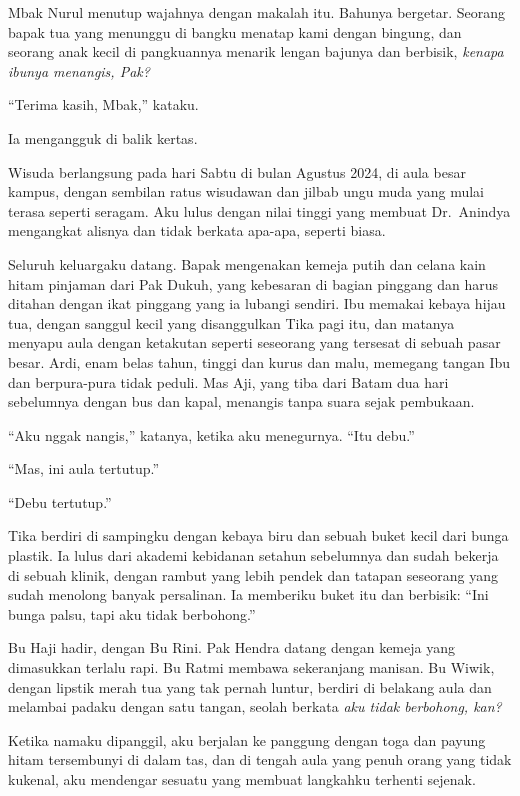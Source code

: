 \documentclass[11pt,twoside,openany]{book}
\makeatletter
\newcommand{\scenebreak}{\par\vspace{0.9em}{\centering\textsc{*\hspace{0.7em}*\hspace{0.7em}*}\par}\vspace{0.9em}\@afterindentfalse\@afterheading}
\makeatother
\begin{document}
Mbak Nurul menutup wajahnya dengan makalah itu. Bahunya bergetar. Seorang bapak tua yang menunggu di bangku menatap kami dengan bingung, dan seorang anak kecil di pangkuannya menarik lengan bajunya dan berbisik, \emph{kenapa ibunya menangis, Pak?}

``Terima kasih, Mbak,'' kataku.

Ia mengangguk di balik kertas.

\scenebreak
Wisuda berlangsung pada hari Sabtu di bulan Agustus 2024, di aula besar kampus, dengan sembilan ratus wisudawan dan jilbab ungu muda yang mulai terasa seperti seragam. Aku lulus dengan nilai tinggi yang membuat Dr.~Anindya mengangkat alisnya dan tidak berkata apa-apa, seperti biasa.

Seluruh keluargaku datang. Bapak mengenakan kemeja putih dan celana kain hitam pinjaman dari Pak Dukuh, yang kebesaran di bagian pinggang dan harus ditahan dengan ikat pinggang yang ia lubangi sendiri. Ibu memakai kebaya hijau tua, dengan sanggul kecil yang disanggulkan Tika pagi itu, dan matanya menyapu aula dengan ketakutan seperti seseorang yang tersesat di sebuah pasar besar. Ardi, enam belas tahun, tinggi dan kurus dan malu, memegang tangan Ibu dan berpura-pura tidak peduli. Mas Aji, yang tiba dari Batam dua hari sebelumnya dengan bus dan kapal, menangis tanpa suara sejak pembukaan.

``Aku nggak nangis,'' katanya, ketika aku menegurnya. ``Itu debu.''

``Mas, ini aula tertutup.''

``Debu tertutup.''

Tika berdiri di sampingku dengan kebaya biru dan sebuah buket kecil dari bunga plastik. Ia lulus dari akademi kebidanan setahun sebelumnya dan sudah bekerja di sebuah klinik, dengan rambut yang lebih pendek dan tatapan seseorang yang sudah menolong banyak persalinan. Ia memberiku buket itu dan berbisik: ``Ini bunga palsu, tapi aku tidak berbohong.''

Bu Haji hadir, dengan Bu Rini. Pak Hendra datang dengan kemeja yang dimasukkan terlalu rapi. Bu Ratmi membawa sekeranjang manisan. Bu Wiwik, dengan lipstik merah tua yang tak pernah luntur, berdiri di belakang aula dan melambai padaku dengan satu tangan, seolah berkata \emph{aku tidak berbohong, kan?}

Ketika namaku dipanggil, aku berjalan ke panggung dengan toga dan payung hitam tersembunyi di dalam tas, dan di tengah aula yang penuh orang yang tidak kukenal, aku mendengar sesuatu yang membuat langkahku terhenti sejenak.
\end{document}
